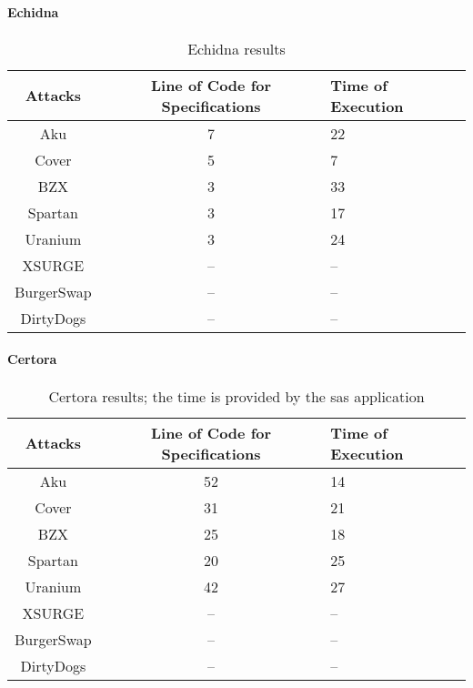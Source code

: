 \paragraph{Echidna}

\begin{center}
    \begin{table*}    
        \caption{Echidna results}
        \label{tab:EchidnaTable}
        \begin{tabular}{ccl}
        \toprule
            Attacks & Line of Code for Specifications & Time of Execution\\
            \midrule
            Aku & 7 & 22 \\ 
            Cover & 5 & 7 \\ 
            BZX & 3 & 33  \\ 
            Spartan & 3 & 17   \\ 
            Uranium & 3 & 24 \\ 
            XSURGE & -- & -- \\  
            BurgerSwap &  -- & --\\ 
            DirtyDogs &  -- & -- \\
        \bottomrule
        \end{tabular}
    \end{table*}
\end{center}

\paragraph{Certora}

\begin{center}
    \begin{table*}
        \caption{Certora results; the time is provided by the sas application}
            \label{tab:CertoraTable}
            \begin{tabular}{ccl}
            \toprule
                Attacks & Line of Code for Specifications & Time of Execution\\
                \midrule
                Aku & 52 & 14 \\ 
                Cover & 31 & 21 \\ 
                BZX & 25  & 18 \\ 
                Spartan & 20  & 25\\ 
                Uranium & 42 & 27  \\ 
                XSURGE &  -- & -- \\  
                BurgerSwap &  -- & --\\ 
                DirtyDogs &  -- & -- \\
            \bottomrule
            \end{tabular}
    \end{table*}
\end{center}

